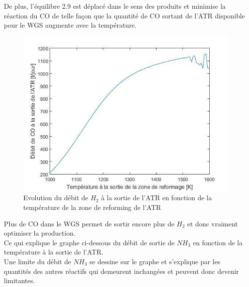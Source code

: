 \documentclass[12pt]{report}
\begin{document}
De plus, l'équilibre 2.9 est déplacé dans le sens des produits et minimise la réaction du CO de telle façon que la quantité de CO sortant de l'ATR disponible pour le WGS augmente avec la température.\\

\begin{figure}[H]
\begin{center}
\includegraphics[scale=0.6]{debit_CO_ATR_Temperature}
\caption{Evolution du débit de $H_2$ à la sortie de l'ATR en fonction de la température de la zone de reforming de l'ATR}
\end{center}
\end{figure}

Plus de CO dans le WGS permet de sortir encore plus de $H_2$ et donc vraiment optimiser la production.\\

Ce qui explique le graphe ci-dessous du débit de sortie de $NH_3$ en fonction de la température à la sortie de l'ATR.\\

Une limite du débit de $NH_3$ se dessine sur le graphe et s'explique par les quantités des autres réactifs qui demeurent inchangées et peuvent donc devenir limitantes.\\
\end{document}
